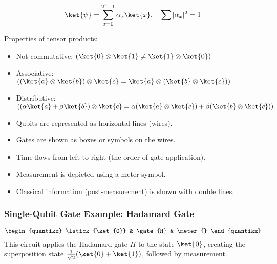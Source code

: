\[
    \ket{\psi} = \sum_{x=0}^{2^n-1} \alpha_x \ket{x}, \quad \sum
    |\alpha_x|^2 = 1
\]

Properties of tensor products:
\begin{itemize}
    \item Not commutative: $(\ket{0} \otimes \ket{1} \neq \ket{1} \otimes
      \ket{0})$
    \item Associative: $((\ket{a} \otimes \ket{b}) \otimes \ket{c} = \ket{a}
      \otimes (\ket{b} \otimes \ket{c}))$
    \item Distributive: $((\alpha\ket{a} + \beta\ket{b}) \otimes \ket{c} =
      \alpha(\ket{a} \otimes \ket{c}) + \beta(\ket{b} \otimes \ket{c}))$
\end{itemize}

\vspace{0.3cm}


\begin{itemize}
    \item Qubits are represented as horizontal lines (wires).
    \item Gates are shown as boxes or symbols on the wires.
    \item Time flows from left to right (the order of gate application).
    \item Measurement is depicted using a meter symbol.
    \item Classical information (post-measurement) is shown with double lines.
\end{itemize}

\subsubsection*{Single-Qubit Gate Example: Hadamard Gate}
\[
\begin{quantikz}
    \lstick{\ket{0}} & \gate{H} & \meter{}
\end{quantikz}
\]
This circuit applies the Hadamard gate $H$ to the state $\ket{0}$, creating
the superposition state $\frac{1}{\sqrt{2}}(\ket{0} + \ket{1})$, followed by
measurement.

